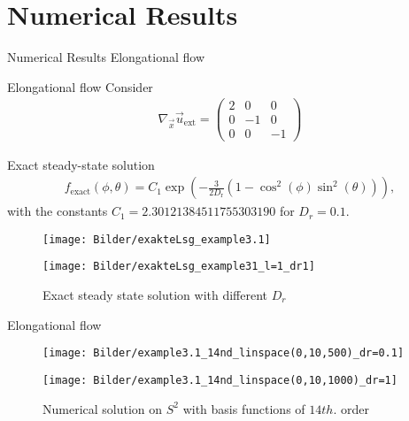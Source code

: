 \section{Numerical Results}

\begin{frame}{Numerical Results}
	\centering
	Elongational flow
\end{frame}


\begin{frame}{Elongational flow}
	\scriptsize
	Consider
	\begin{align*}
		\nabla_{\vec{x}} \vec{u}_{\mathrm{ext}}=\left(\begin{array}{ccc}
			2 & 0 & 0 \\
			0 & -1 & 0 \\
			0 & 0 & -1
		\end{array}\right) %
	\end{align*}
	
	Exact steady-state solution
	\begin{align}
		f_{\text {exact}}(\phi, \theta)=C_1 \exp \left(-\frac{3}{2 D_{\mathrm{r}}}\left(1-\cos ^2(\phi) \sin ^2(\theta)\right)\right),
	\end{align}
	with the constants $C_1 = 2.30121384511755303190$ for $D_r=0.1$.
	
	\begin{figure}
		\begin{minipage}{0.4\textwidth}
			\texttt{[image: Bilder/exakteLsg\_example3.1]}
		\end{minipage}
		\hfill 
		\begin{minipage}{0.4\textwidth}
			\texttt{[image: Bilder/exakteLsg\_example31\_l=1\_dr1]}
		\end{minipage}
		\caption{Exact steady state solution with different $D_r$}
	\end{figure}
	
\end{frame}



\begin{frame}{Elongational flow}
	\begin{figure}
		\begin{minipage}{0.48\textwidth}
			\texttt{[image: Bilder/example3.1\_14nd\_linspace(0,10,500)\_dr=0.1]}
		\end{minipage}
		\hfill 
		\begin{minipage}{0.48\textwidth}
			\texttt{[image: Bilder/example3.1\_14nd\_linspace(0,10,1000)\_dr=1]}
		\end{minipage}
		\caption{Numerical solution on $S^2$ with basis functions of $14th.$ order}
	\end{figure}
\end{frame}

